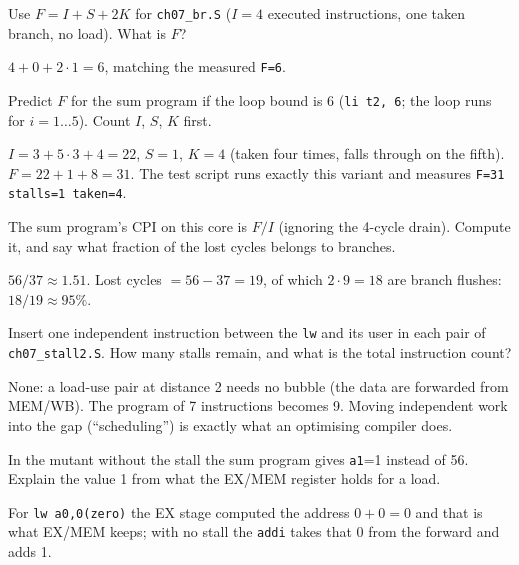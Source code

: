 \begin{exercise}[easy]\label{ex:e07d}
Use $F=I+S+2K$ for \texttt{ch07\_br.S} ($I=4$ executed instructions,
one taken branch, no load). What is $F$?
\end{exercise}
\begin{solution}[hint]
$4+0+2\cdot1=6$, matching the measured \texttt{F=6}.
\end{solution}

\begin{exercise}[medium]\label{ex:m07e}
Predict $F$ for the sum program if the loop bound is 6
(\texttt{li t2, 6}; the loop runs for $i=1\dots5$). Count $I$, $S$, $K$
first.
\end{exercise}
\begin{solution}[hint]
$I=3+5\cdot3+4=22$, $S=1$, $K=4$ (taken four times, falls through on
the fifth). $F=22+1+8=31$. The test script runs exactly this variant
and measures \texttt{F=31 stalls=1 taken=4}.
\end{solution}

\begin{exercise}[medium]\label{ex:m07f}
The sum program's CPI on this core is $F/I$ (ignoring the 4-cycle
drain). Compute it, and say what fraction of the lost cycles belongs
to branches.
\end{exercise}
\begin{solution}[hint]
$56/37\approx1.51$. Lost cycles $=56-37=19$, of which $2\cdot9=18$ are
branch flushes: $18/19\approx95\%$.
\end{solution}

\begin{exercise}[medium]\label{ex:m07g}
Insert one independent instruction between the \texttt{lw} and its
user in each pair of \texttt{ch07\_stall2.S}. How many stalls remain,
and what is the total instruction count?
\end{exercise}
\begin{solution}[hint]
None: a load-use pair at distance 2 needs no bubble (the data are
forwarded from MEM/WB). The program of 7 instructions becomes 9.
Moving independent work into the gap (``scheduling'') is exactly what
an optimising compiler does.
\end{solution}

\begin{exercise}[hard]\label{ex:h07c}
In the mutant without the stall the sum program gives \texttt{a1}=1
instead of 56. Explain the value 1 from what the EX/MEM register holds
for a load.
\end{exercise}
\begin{solution}[hint]
For \texttt{lw a0,0(zero)} the EX stage computed the address
$0+0=0$ and that is what EX/MEM keeps; with no stall the \texttt{addi}
takes that 0 from the forward and adds 1.
\end{solution}


